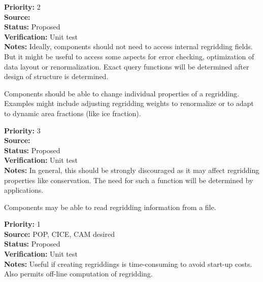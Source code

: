 \begin{reqlist}
{\bf Priority:} 2 \\
{\bf Source:}  \\
{\bf Status:} Proposed \\
{\bf Verification:} Unit test \\
{\bf Notes:} Ideally, components should not need to access internal
             regridding fields.  But it might be useful to access some
             aspects for error checking, optimization of data layout or
             renormalization.  Exact query functions will be determined
             after design of structure is determined.
\end{reqlist}


Components should be able to change individual properties of a
regridding.  Examples might include adjusting regridding weights to 
renormalize or to adapt to dynamic area fractions (like ice fraction).

\begin{reqlist}
{\bf Priority:} 3 \\
{\bf Source:}  \\
{\bf Status:} Proposed \\
{\bf Verification:} Unit test \\
{\bf Notes:} In general, this should be strongly discouraged as it may
             affect regridding properties like conservation.  The need
             for such a function will be determined by applications.
\end{reqlist}


Components may be able to read regridding information from a file.

\begin{reqlist}
{\bf Priority:} 1 \\
{\bf Source:} POP, CICE, CAM desired \\
{\bf Status:} Proposed \\
{\bf Verification:} Unit test \\
{\bf Notes:} Useful if creating regriddings is time-consuming to avoid
             start-up costs. Also permits off-line computation of regridding.
\end{reqlist}


